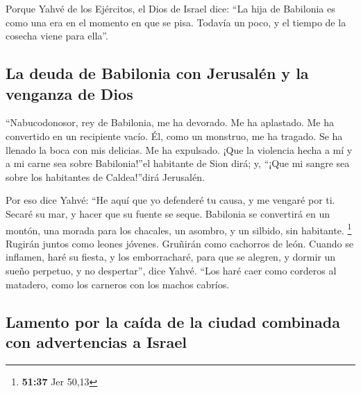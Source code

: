 \begin{paracol}{2}
 Porque Yahvé de los Ejércitos, el Dios de Israel dice:
``La hija de Babilonia es como una era en el momento en que se pisa.
Todavía un poco, y el tiempo de la cosecha viene para ella''.

\hypertarget{la-deuda-de-babilonia-con-jerusaluxe9n-y-la-venganza-de-dios}{%
\subsection{La deuda de Babilonia con Jerusalén y la venganza de
Dios}\label{la-deuda-de-babilonia-con-jerusaluxe9n-y-la-venganza-de-dios}}

 ``Nabucodonosor, rey de Babilonia, me ha devorado. Me ha
aplastado. Me ha convertido en un recipiente vacío. Él, como un
monstruo, me ha tragado. Se ha llenado la boca con mis delicias. Me ha
expulsado.  ¡Que la violencia hecha a mí y a mi carne sea
sobre Babilonia!''el habitante de Sion dirá; y, ``¡Que mi sangre sea
sobre los habitantes de Caldea!''dirá Jerusalén.

 Por eso dice Yahvé: ``He aquí que yo defenderé tu causa,
y me vengaré por ti. Secaré su mar, y hacer que su fuente se seque.
 Babilonia se convertirá en un montón, una morada para
los chacales, un asombro, y un silbido, sin habitante. \footnote{\textbf{51:37}
  Jer 50,13}  Rugirán juntos como leones jóvenes.
Gruñirán como cachorros de león.  Cuando se inflamen,
haré su fiesta, y los emborracharé, para que se alegren, y dormir un
sueño perpetuo, y no despertar'', dice Yahvé.  ``Los haré
caer como corderos al matadero, como los carneros con los machos
cabríos.

\hypertarget{lamento-por-la-cauxedda-de-la-ciudad-combinada-con-advertencias-a-israel}{%
\subsection{Lamento por la caída de la ciudad combinada con advertencias
a
Israel}\label{lamento-por-la-cauxedda-de-la-ciudad-combinada-con-advertencias-a-israel}}


\end{paracol}
